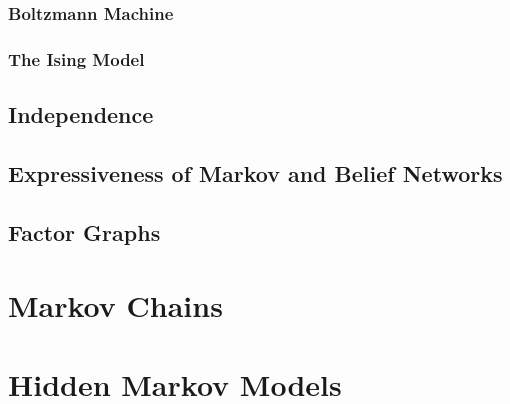 \subsubsection*{Boltzmann Machine}

\subsubsection*{The Ising Model}

\subsection{Independence}

\subsection{Expressiveness of Markov and Belief Networks}

\subsection{Factor Graphs}

\section{Markov Chains}

\section{Hidden Markov Models}